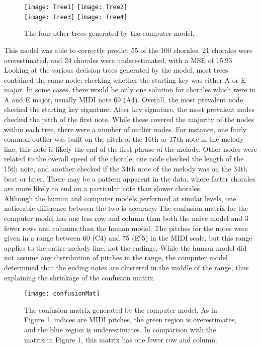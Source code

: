 \documentclass[12pt]{article}
\begin{document}
\begin{figure}[h]
  \centering
  \texttt{[image: Tree1]}
  \texttt{[image: Tree2]}\\
  \centering
  \texttt{[image: Tree3]}
  \texttt{[image: Tree4]}
  \caption{The four other trees generated by the computer model. }
\end{figure}

This model was able to correctly predict 55 of the 100 chorales. 21 chorales were overestimated, and 24 chorales were underestimated, with a MSE of 15.93. Looking at the various decision trees generated by the model, most trees contained the same node: checking whether the starting key was either A or E major. In some cases, there would be only one solution for chorales which were in A and E major, usually MIDI note 69 (A4). Overall, the most prevalent node checked the starting key signature. After key signature, the most prevalent nodes checked the pitch of the first note. While these covered the majority of the nodes within each tree, there were a number of outlier nodes. For instance, one fairly common outlier was built on the pitch of the 16th or 17th note in the melody line; this note is likely the end of the first phrase of the melody. Other nodes were related to the overall speed of the chorale; one node checked the length of the 15th note, and another checked if the 34th note of the melody was on the 34th beat or later. There may be a pattern apparent in the data, where faster chorales are more likely to end on a particular note than slower chorales.\\

Although the human and computer models performed at similar levels, one noticeable difference between the two is accuracy. The confusion matrix for the computer model has one less row and column than both the naive model and 3 fewer rows and columns than the human model. The pitches for the notes were given in a range between 60 (C4) and 75 (E$^b$5) in the MIDI scale, but this range applies to the entire melody line, not the endings. While the human model did not assume any distribution of pitches in the range, the computer model determined that the ending notes are clustered in the middle of the range, thus explaining the shrinkage of the confusion matrix.\\

\begin{figure}[h]
  \texttt{[image: confusionMat]}
  \centering
  \caption{The confusion matrix generated by the computer model. As in Figure 1, indices are MIDI pitches, the green region is overestimates, and the blue region is underestimates. In comparison with the matrix in Figure 1, this matrix has one fewer row and column.}
\end{figure}
\end{document}
